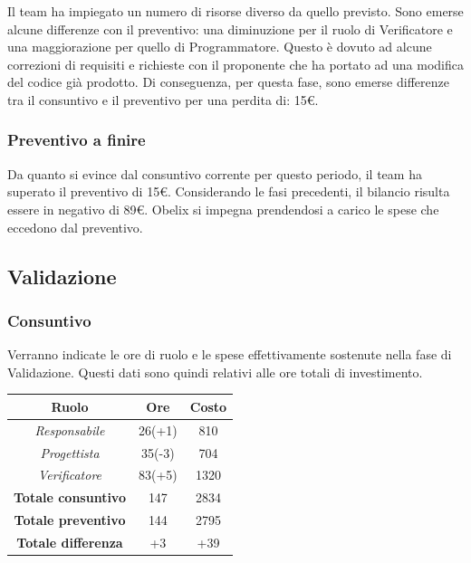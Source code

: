 Il team ha impiegato un numero di risorse diverso da quello previsto. Sono emerse alcune differenze con il preventivo: una diminuzione per il ruolo di Verificatore e una maggiorazione per quello di Programmatore. Questo è dovuto ad alcune correzioni di requisiti e richieste con il proponente che ha portato ad una modifica del codice già prodotto.
Di conseguenza, per questa fase, sono emerse differenze tra il consuntivo e il preventivo per una perdita di: 15€.

\subsubsection{Preventivo a finire}
Da quanto si evince dal consuntivo corrente per questo periodo, il team ha superato il preventivo
di 15€. Considerando le fasi precedenti, il bilancio risulta essere in negativo di 89€. Obelix si impegna prendendosi a carico le spese che eccedono dal preventivo. 


\subsection{Validazione}

\subsubsection{Consuntivo}

Verranno indicate le ore di ruolo e le spese effettivamente sostenute nella fase di Validazione. Questi dati sono quindi relativi alle ore totali di investimento.

\begin{center}
	\centering
	\begin{tabular}{|c|c|c|}
		\hline
		\textbf{Ruolo} & \textbf{Ore} & \textbf{Costo} \\
		\hline
		\emph{Responsabile}  & 26(+1) & 810 \\
		\hline  \emph{Progettista}  & 35(-3) & 704 \\
		\hline  \emph{Verificatore}  & 83(+5) & 1320 \\
		\hline
		\textbf{Totale consuntivo} & 147 & 2834 \\
		\hline
		\textbf{Totale preventivo} & 144 &  2795\\
		\hline
		\textbf{Totale differenza} & +3 & +39 \\
		\hline
	\end{tabular}
	
\end{center}

